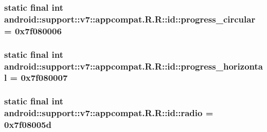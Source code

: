 \hypertarget{classandroid_1_1support_1_1v7_1_1appcompat_1_1_r_1_1id_ab35c0643481f8c93a6a545580150ee8}{
\subsubsection[{progress\_\-circular}]{\setlength{\rightskip}{0pt plus 5cm}static final int android::support::v7::appcompat.R.R::id::progress\_\-circular = 0x7f080006}}
\label{classandroid_1_1support_1_1v7_1_1appcompat_1_1_r_1_1id_ab35c0643481f8c93a6a545580150ee8}


\hypertarget{classandroid_1_1support_1_1v7_1_1appcompat_1_1_r_1_1id_4e9f70dee5cd903101ab337e9defcd62}{
\subsubsection[{progress\_\-horizontal}]{\setlength{\rightskip}{0pt plus 5cm}static final int android::support::v7::appcompat.R.R::id::progress\_\-horizontal = 0x7f080007}}
\label{classandroid_1_1support_1_1v7_1_1appcompat_1_1_r_1_1id_4e9f70dee5cd903101ab337e9defcd62}


\hypertarget{classandroid_1_1support_1_1v7_1_1appcompat_1_1_r_1_1id_89606045473fd367db28248ace909c6f}{
\subsubsection[{radio}]{\setlength{\rightskip}{0pt plus 5cm}static final int android::support::v7::appcompat.R.R::id::radio = 0x7f08005d}}
\label{classandroid_1_1support_1_1v7_1_1appcompat_1_1_r_1_1id_89606045473fd367db28248ace909c6f}


